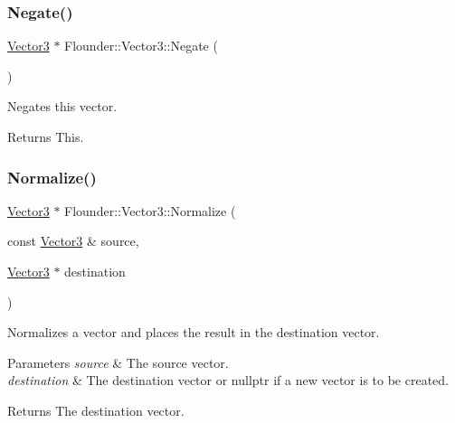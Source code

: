\subsubsection{\texorpdfstring{Negate()}{Negate()}\hspace{0.1cm}{\footnotesize\ttfamily [2/2]}}
{\footnotesize\ttfamily \hyperlink{class_flounder_1_1_vector3}{Vector3} $\ast$ Flounder\+::\+Vector3\+::\+Negate (\begin{DoxyParamCaption}{ }\end{DoxyParamCaption})}



Negates this vector. 

\begin{DoxyReturn}{Returns}
This. 
\end{DoxyReturn}
\mbox{\label{class_flounder_1_1_vector3_aef9af94dd8db49ceb2f24cbee6bb5f6f}} 
\subsubsection{\texorpdfstring{Normalize()}{Normalize()}\hspace{0.1cm}{\footnotesize\ttfamily [1/2]}}
{\footnotesize\ttfamily \hyperlink{class_flounder_1_1_vector3}{Vector3} $\ast$ Flounder\+::\+Vector3\+::\+Normalize (\begin{DoxyParamCaption}\item[{const \hyperlink{class_flounder_1_1_vector3}{Vector3} \&}]{source,  }\item[{\hyperlink{class_flounder_1_1_vector3}{Vector3} $\ast$}]{destination }\end{DoxyParamCaption})\hspace{0.3cm}{\ttfamily [static]}}



Normalizes a vector and places the result in the destination vector. 


\begin{DoxyParams}{Parameters}
{\em source} & The source vector. \\
\hline
{\em destination} & The destination vector or nullptr if a new vector is to be created. \\
\hline
\end{DoxyParams}
\begin{DoxyReturn}{Returns}
The destination vector. 
\end{DoxyReturn}
\mbox{\label{class_flounder_1_1_vector3_a986eea720eeb8e45b65e9fb445cae3e4}} 
